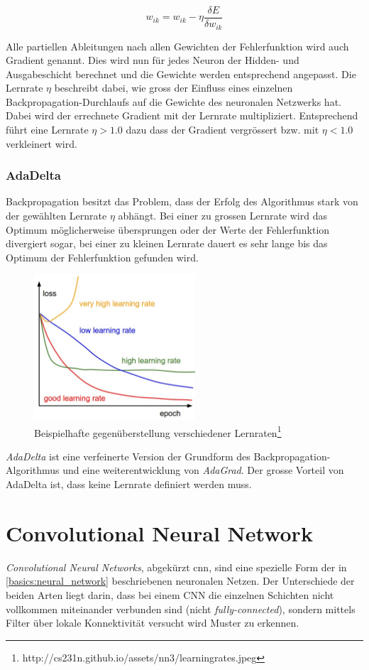 \begin{equation}
w_{ik} = w_{ik} - \eta \frac{\delta E}{\delta w_{ik}}
\end{equation}

Alle partiellen Ableitungen nach allen Gewichten der Fehlerfunktion wird auch Gradient genannt. Dies wird nun für jedes Neuron der Hidden- und Ausgabeschicht berechnet und die Gewichte werden entsprechend angepasst. Die Lernrate $\eta$ beschreibt dabei, wie gross der Einfluss eines einzelnen Backpropagation-Durchlaufs auf die Gewichte des neuronalen Netzwerks hat. Dabei wird der errechnete Gradient mit der Lernrate multipliziert. Entsprechend führt eine Lernrate $\eta > 1.0$ dazu dass der Gradient vergrössert bzw. mit $\eta < 1.0$ verkleinert wird.
\subsubsection{AdaDelta}
Backpropagation besitzt das Problem, dass der Erfolg des Algorithmus stark von der gewählten Lernrate $\eta$ abhängt. Bei einer zu grossen Lernrate wird das Optimum möglicherweise übersprungen oder der Werte der Fehlerfunktion divergiert sogar, bei einer zu kleinen Lernrate dauert es sehr lange bis das Optimum der Fehlerfunktion gefunden wird.\\

\begin{figure}[h]
	\centering
	\includegraphics[width=6cm]{img/learning_rates_comparison}
	\caption{Beispielhafte gegenüberstellung verschiedener Lernraten\protect\footnote{http://cs231n.github.io/assets/nn3/learningrates.jpeg}}
\end{figure}

\emph{AdaDelta} \cite{zeiler2012adadelta} ist eine verfeinerte Version der Grundform des Backpropagation-Algorithmus und eine weiterentwicklung von \emph{AdaGrad}. Der grosse Vorteil von AdaDelta ist, dass keine Lernrate definiert werden muss. 
\section{Convolutional Neural Network}
\emph{Convolutional Neural Networks}, abgekürzt \gls{cnn}, sind eine spezielle Form der in \ref{basics:neural_network} beschriebenen neuronalen Netzen. Der Unterschiede der beiden Arten liegt darin, dass bei einem CNN die einzelnen Schichten nicht vollkommen miteinander verbunden sind (nicht \emph{fully-connected}), sondern mittels Filter über lokale Konnektivität versucht wird Muster zu erkennen.
